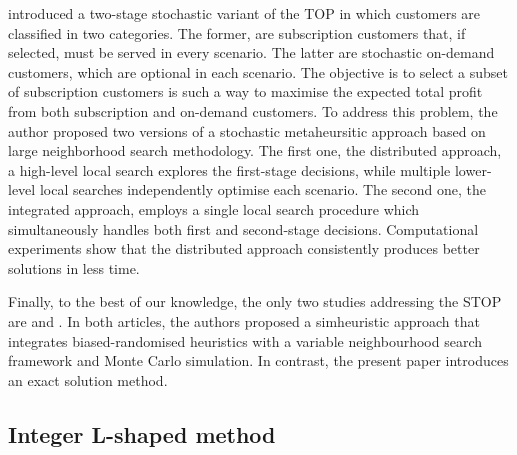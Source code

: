 \documentclass[11pt]{article}
\theoremstyle{definition}
\begin{document}
\citet{PISINGER2026107365} introduced a two-stage stochastic variant of the TOP in which customers are classified in two categories. The former, are subscription customers that, if selected, must be served in every scenario. The latter are stochastic on-demand customers, which are optional in each scenario. The objective is to select a subset of subscription customers is such a way to maximise the expected total profit from both subscription and on-demand customers. To address this problem, the author proposed two versions of a stochastic metaheursitic approach based on large neighborhood search methodology. The first one, the distributed approach, a high-level local search explores the first-stage decisions, while multiple lower-level local searches independently optimise each scenario. The second one, the integrated approach, employs a single local search procedure which simultaneously handles both first and second-stage decisions.
Computational experiments show that the distributed approach consistently produces better solutions in less time.

Finally, to the best of our knowledge, the only two studies addressing the STOP are \citet{Panadero2017} and \citet{Panadero2023}.
In both articles, the authors proposed a simheuristic approach that integrates biased-randomised heuristics with a variable neighbourhood search framework and Monte Carlo simulation. In contrast, the present paper introduces an exact solution method.


\subsection{Integer L-shaped method}
\label{ssec:literature:ILM}
\end{document}
